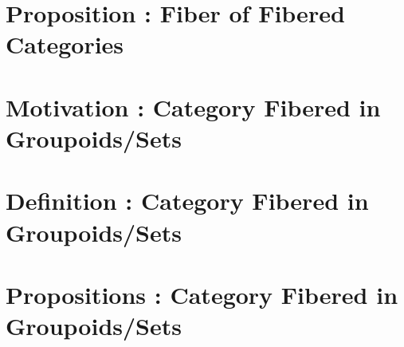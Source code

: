 \documentclass[a4paper, dvipdfmx]{jsarticle}
\begin{document}
\section{Proposition : Fiber of Fibered Categories}

\section{Motivation : Category Fibered in Groupoids/Sets}

\section{Definition : Category Fibered in Groupoids/Sets}
\begin{Def}
\end{Def}

\begin{Def}
\end{Def}

\section{Propositions : Category Fibered in Groupoids/Sets}



\end{document}
